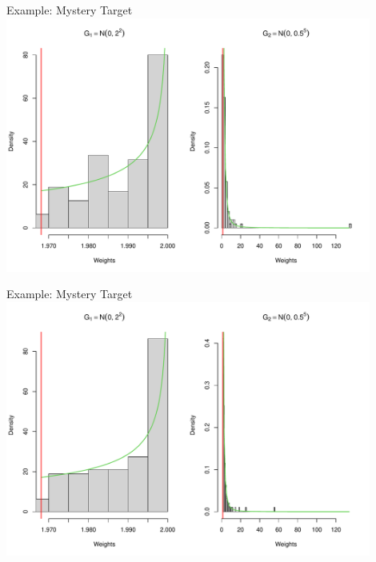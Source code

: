 \documentclass[14pt]{beamer}
\begin{document}
\begin{frame}{Example: Mystery Target}
    \centering
    \includegraphics[height=0.9\textheight, width=0.9\textwidth, keepaspectratio]{Figures/Wt Hist - Pareto Dens Zoom.pdf}
\end{frame}

\begin{frame}{Example: Mystery Target}
    \centering
    \includegraphics[height=0.9\textheight, width=0.9\textwidth, keepaspectratio]{Figures/Wt Hist - Pareto Smooth Zoom.pdf}
\end{frame}
\end{document}

